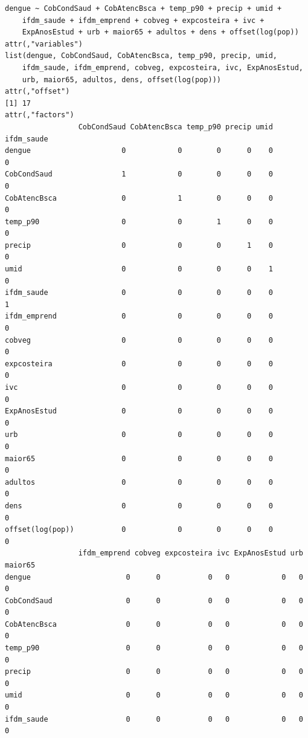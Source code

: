 \documentclass[12pt,a4paper]{article}\usepackage[]{graphicx}\usepackage[]{color}
\makeatletter
\newenvironment{kframe}{%
 \def\at@end@of@kframe{}%
 \ifinner\ifhmode%
  \def\at@end@of@kframe{\end{minipage}}%
  \begin{minipage}{\columnwidth}%
 \fi\fi%
 \def\FrameCommand##1{\hskip\@totalleftmargin \hskip-\fboxsep
 \colorbox{shadecolor}{##1}\hskip-\fboxsep
     \hskip-\linewidth \hskip-\@totalleftmargin \hskip\columnwidth}%
 \MakeFramed {\advance\hsize-\width
   \@totalleftmargin\z@ \linewidth\hsize
   \@setminipage}}%
 {\par\unskip\endMakeFramed%
 \at@end@of@kframe}
\newenvironment{knitrout}{}{} %
\makeatother
\begin{document}
\begin{knitrout}
\color{fgcolor}\begin{kframe}
\begin{verbatim}
dengue ~ CobCondSaud + CobAtencBsca + temp_p90 + precip + umid + 
    ifdm_saude + ifdm_emprend + cobveg + expcosteira + ivc + 
    ExpAnosEstud + urb + maior65 + adultos + dens + offset(log(pop))
attr(,"variables")
list(dengue, CobCondSaud, CobAtencBsca, temp_p90, precip, umid, 
    ifdm_saude, ifdm_emprend, cobveg, expcosteira, ivc, ExpAnosEstud, 
    urb, maior65, adultos, dens, offset(log(pop)))
attr(,"offset")
[1] 17
attr(,"factors")
                 CobCondSaud CobAtencBsca temp_p90 precip umid ifdm_saude
dengue                     0            0        0      0    0          0
CobCondSaud                1            0        0      0    0          0
CobAtencBsca               0            1        0      0    0          0
temp_p90                   0            0        1      0    0          0
precip                     0            0        0      1    0          0
umid                       0            0        0      0    1          0
ifdm_saude                 0            0        0      0    0          1
ifdm_emprend               0            0        0      0    0          0
cobveg                     0            0        0      0    0          0
expcosteira                0            0        0      0    0          0
ivc                        0            0        0      0    0          0
ExpAnosEstud               0            0        0      0    0          0
urb                        0            0        0      0    0          0
maior65                    0            0        0      0    0          0
adultos                    0            0        0      0    0          0
dens                       0            0        0      0    0          0
offset(log(pop))           0            0        0      0    0          0
                 ifdm_emprend cobveg expcosteira ivc ExpAnosEstud urb maior65
dengue                      0      0           0   0            0   0       0
CobCondSaud                 0      0           0   0            0   0       0
CobAtencBsca                0      0           0   0            0   0       0
temp_p90                    0      0           0   0            0   0       0
precip                      0      0           0   0            0   0       0
umid                        0      0           0   0            0   0       0
ifdm_saude                  0      0           0   0            0   0       0

\end{verbatim}
\end{kframe}
\end{knitrout}
\end{document}
